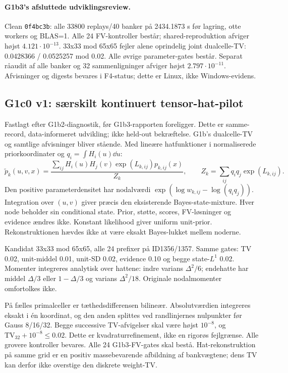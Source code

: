 \paragraph{G1b3's afsluttede udviklingsreview.}
Clean \texttt{0f4bc3b}: alle 33800 replays/40 banker på 2434.1873 s
før lagring, otte workers og BLAS=1. Alle 24 FV-kontroller består;
shared-reproduktion afviger højst \( 4.121\cdot10^{-13} \).
33x33 mod 65x65 fejler alene oprindelig joint dualcelle-TV:
0.0428366 / 0.0525257 mod 0.02.
Alle øvrige parameter-gates består. Separat råaudit af alle banker og 32
sammenligninger afviger højst \( 2.797\cdot10^{-11} \).
Afvisninger og digests bevares i F4-status; dette er Linux, ikke Windows-evidens.

\subsection{G1c0 v1: særskilt kontinuert tensor-hat-pilot}
Fastlagt efter G1b2-diagnostik, før G1b3-rapporten foreligger. Dette er
samme-record, data-informeret udvikling; ikke held-out bekræftelse.
G1b's dualcelle-TV og samtlige afvisninger bliver stående. Med lineære
hatfunktioner i normaliserede priorkoordinater og \(q_i=\int H_i(u)\dd u\):
\begin{equation}
 \widetilde p_k(u,v,x)=\frac{\sum_{ij}H_i(u)H_j(v)
       \exp(L_{k,ij})p_{k,ij}(x)}{Z_k},\qquad
 Z_k=\sum_{ij}q_iq_j\exp(L_{k,ij}).
\end{equation}
Den positive parameterdensitet har nodalværdi
\(\exp(\log w_{k,ij}-\log(q_iq_j))\). Integration over \((u,v)\)
giver præcis den eksisterende Bayes-state-mixture. Hver node beholder sin
conditional state. Prior, støtte, scores, FV-løsninger og evidence ændres
ikke. Konstant likelihood giver uniform unit-prior. Rekonstruktionen
hævdes ikke at være eksakt Bayes-lukket mellem noderne.

Kandidat 33x33 mod 65x65, alle 24 prefixer på ID1356/1357. Samme gates:
TV 0.02, unit-middel 0.01, unit-SD 0.02, evidence 0.10 og begge state-\(L^1\)
0.02. Momenter integreres analytisk over hattene: indre varians
\(\Delta^2/6\); endehatte har middel \(\Delta/3\) eller \(1-\Delta/3\)
og varians \(\Delta^2/18\). Originale nodalmomenter omfortolkes ikke.

På fælles primalceller er tæthedsdifferensen bilineær. Absolutværdien
integreres eksakt i én koordinat, og den anden splittes ved randlinjernes
nulpunkter før Gauss 8/16/32. Begge successive TV-afvigelser skal være
højst \(10^{-8}\), og \(\mathrm{TV}_{32}+10^{-8}\le0.02\).
Dette er kvadraturrefinement, ikke en rigorøs fejlgrænse. Alle grovere
kontroller bevares. Alle 24 G1b3-FV-gates skal bestå. Hat-rekonstruktion
på samme grid er en positiv massebevarende afbildning af bankvægtene;
dens TV kan derfor ikke overstige den diskrete weight-TV.

